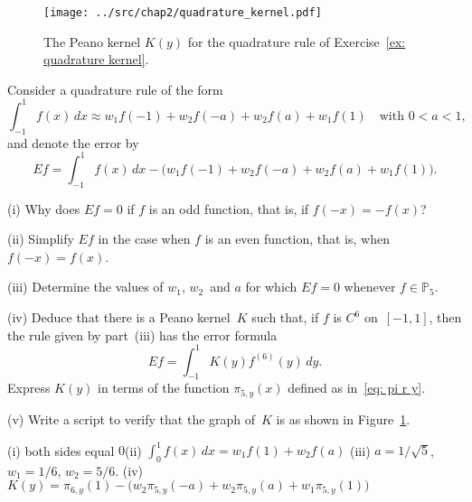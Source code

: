 \begin{Exercises}
\begin{figure}
\caption{The Peano kernel $K(y)$ for the quadrature rule of 
Exercise~\ref{ex: quadrature kernel}.}\label{fig: quadrature kernel}
\begin{center}
\texttt{[image: ../src/chap2/quadrature\_kernel.pdf]}
\end{center}
\end{figure}

\exercise\label{ex: quadrature kernel}
Consider a quadrature rule of the form
\[
\int_{-1}^1f(x)\,dx\approx w_1f(-1)+w_2f(-a)+w_2f(a)+w_1f(1)
\quad\text{with $0<a<1$,}
\]
and denote the error by
\[
Ef=\int_{-1}^1f(x)\,dx-\bigl(w_1f(-1)+w_2f(-a)+w_2f(a)+w_1f(1)\bigr).
\]
\begin{description}
\item{(i)} Why does $Ef=0$ if $f$ is an odd function, that is, if
$f(-x)=-f(x)$?
\item{(ii)} Simplify $Ef$ in the case when $f$ is an even function, that is, 
when $f(-x)=f(x)$. \item{(iii)}
Determine the values of $w_1$, $w_2$~and $a$ for which $Ef=0$ whenever
$f\in\mathbb{P}_5$.
\item{(iv)}
Deduce that there is a Peano kernel~$K$ such that, if $f$ is $C^6$ 
on~$[-1,1]$, then the rule given by part~(iii) has the error formula
\[
Ef=\int_{-1}^1K(y)f^{(6)}(y)\,dy.
\]
Express $K(y)$ in terms of the function $\pi_{5,y}(x)$ defined as 
in~\eqref{eq: pi r y}.
\item{(v)}
Write a script to verify that the graph of~$K$ is as shown in 
Figure~\ref{fig: quadrature kernel}.
\end{description}
\begin{ans}
(i) both sides equal $0$\quad (ii) $\int_0^1f(x)\,dx=w_1f(1)+w_2f(a)$\quad
(iii) $a=1/\sqrt{5}$, $w_1=1/6$, $w_2=5/6$.\quad
(iv) $K(y)=\pi_{6,y}(1)-\bigl(w_2\pi_{5,y}(-a)+w_2\pi_{5,y}(a)+w_1\pi_{5,y}(1)
\bigr)$
\end{ans}


\end{Exercises}

